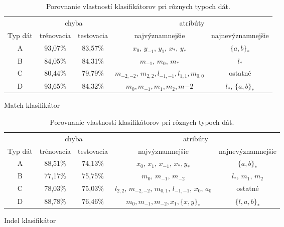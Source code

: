 \begin{table}[htp]
\centering
\begin{subtable}{\textwidth}
\centering
\begin{tabular}{c|cccc}
& \multicolumn{2}{c}{chyba} & \multicolumn{2}{c}{atribúty}\\
Typ dát & trénovacia & testovacia & najvýznamnejšie & najnevýznamnejšie\\
\hline
A & 93,07\% & 83,57\% & $x_0,\, y_{-1},\, y_{1},\, x_*,\, y_*$ & $\{a,b\}_*$\\
B & 84,05\% & 84.31\% & $m_{-1},\, m_0,\, m_*$ & $l_*$ \\
C & 80,44\% & 79,79\% & $m_{-2,-2},\, m_{2,2}, l_{-1,-1}, l_{1,1}, m_{0,0}$ & ostatné\\
D & 93,65\% & 84,32\% & $m_0, m_{-1}, m_1, m_2, m{-2}$ & $l_*,\, \{a,b\}_*$
\end{tabular}
\caption{Match klasifikátor}
\end{subtable}

\begin{subtable}{\textwidth}
\centering
\begin{tabular}{c|cccc}
& \multicolumn{2}{c}{chyba} & \multicolumn{2}{c}{atribúty}\\
Typ dát & trénovacia & testovacia & najvýznamnejšie & najnevýznamnejšie\\
\hline
A & 88,51\% & 74,13\% & $x_0,\, x_{1},\, x_{-1},\, x_*, y_*$ & $\{a,b\}_*$\\
B & 77,17\% & 75,75\% & $m_0,\, m_{-1},\, m_{-2}$ & $l_*,\, m_1,\, m_2$ \\
C & 78,03\% & 75,03\% & $l_{2,2},\,m_{-2,-2},\,m_{0,1},\,l_{-1,-1},\, x_0,\,a_0$ & ostatné\\
D & 88,78\% & 76,46\% & $m_0, m_{-1}, m_{-2}, x_1, \{x, y\}_*$ & $\{l,a,b\}_*$\\
\end{tabular}
\caption{Indel klasifikátor}
\end{subtable}
\caption[Porovnanie vlastností klasifikátorov]{Porovnanie vlastností klasifikátorov pri rôznych typoch dát.}
\label{tab:clf-results}
\end{table}
\todo




